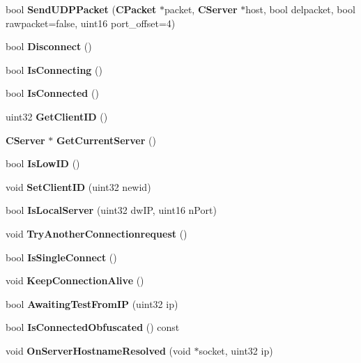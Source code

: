 \begin{DoxyCompactItemize}
\item 
bool {\bfseries SendUDPPacket} ({\bf CPacket} $\ast$packet, {\bf CServer} $\ast$host, bool delpacket, bool rawpacket=false, uint16 port\_\-offset=4)\label{classCServerConnect_a2091993f2e78eafaa6882b235421f1ee}

\item 
bool {\bfseries Disconnect} ()\label{classCServerConnect_ad96eb40f3370e43c79b3660aca94bdc0}

\item 
bool {\bfseries IsConnecting} ()\label{classCServerConnect_a4659610363c1436bf98be2cd6de43013}

\item 
bool {\bfseries IsConnected} ()\label{classCServerConnect_a80a21f1e2616ff1286dccee19011563f}

\item 
uint32 {\bfseries GetClientID} ()\label{classCServerConnect_abe72c0d215de3ef7ee6063365cd6f1e0}

\item 
{\bf CServer} $\ast$ {\bfseries GetCurrentServer} ()\label{classCServerConnect_ac50aea2ccc4293afbe9b9e15fb6722bd}

\item 
bool {\bfseries IsLowID} ()\label{classCServerConnect_a890ab920b1c8ba4cd0d2cc037f382c52}

\item 
void {\bfseries SetClientID} (uint32 newid)\label{classCServerConnect_a5b1e29c28f55831cb82ecc8ba418acb1}

\item 
bool {\bfseries IsLocalServer} (uint32 dwIP, uint16 nPort)\label{classCServerConnect_ab82556251807e44ef68c98b8bac801ba}

\item 
void {\bfseries TryAnotherConnectionrequest} ()\label{classCServerConnect_ae654f82ff869ce6ec02b108b335a0e6b}

\item 
bool {\bfseries IsSingleConnect} ()\label{classCServerConnect_ab86502f4718b80132da0dcbf26281057}

\item 
void {\bfseries KeepConnectionAlive} ()\label{classCServerConnect_a556547dc22856d1d3969d605238c6d82}

\item 
bool {\bfseries AwaitingTestFromIP} (uint32 ip)\label{classCServerConnect_a4e46058526cf84d65bca046b26c2d5b3}

\item 
bool {\bfseries IsConnectedObfuscated} () const \label{classCServerConnect_a95cf0b2b8cc4aade24e2de95904ef704}

\item 
void {\bf OnServerHostnameResolved} (void $\ast$socket, uint32 ip)
\end{DoxyCompactItemize}
